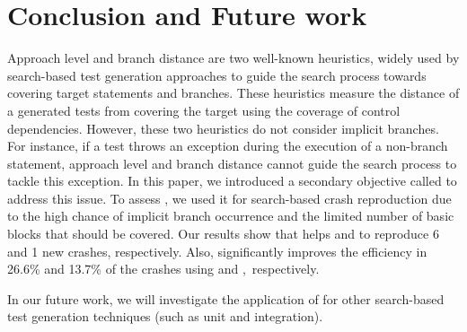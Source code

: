 \section{Conclusion and Future work} 
\label{sec:bbc:confut}

Approach level and branch distance are two well-known heuristics, widely used by search-based test generation approaches to guide the search process towards covering target statements and branches. These heuristics measure the distance of a generated tests from covering the target using the coverage of control dependencies. However, these two heuristics do not consider implicit branches. For instance, if a test throws an exception during the execution of a non-branch statement, approach level and branch distance cannot guide the search process to tackle this exception. In this paper, we introduced a secondary objective called \bbc to address this issue. To assess \bbc, we used it for search-based crash reproduction due to the high chance of implicit branch occurrence and the limited number of basic blocks that should be covered.
Our results show that \bbc helps \integ and \WS to reproduce 6 and 1 new crashes, respectively.
Also, \bbc significantly improves the efficiency in 26.6\% and 13.7\% of the crashes using \integ and \WS,~respectively.

In our future work, we will investigate the application of \bbc for other search-based test generation techniques (such as unit and  integration).
\vspace{-1em}